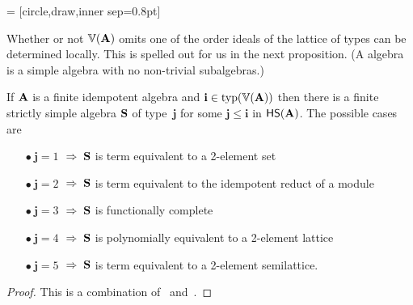 \newcommand{\dotsize}{0.8pt}
 = [circle,draw,inner sep=\dotsize]
\begin{center}
\newcommand{\figscale}{.7}
\end{center}
Whether or not $\operatorname{\mathbb{V}}(\mathbf{A})$ omits one of the order ideals of the lattice of types can be
determined locally.  This is spelled out for us in the next proposition.
(A  algebra is a simple
algebra with no non-trivial subalgebras.)


\begin{prop}
  \label{prop:2.1}
If $\mathbf{A}$ is a finite idempotent algebra and
$\mathbf{i} \in \operatorname{typ}(\operatorname{\mathbb{V}}(\mathbf{A}))$ then there
is a finite strictly simple algebra $\mathbf{S}$ of
type~$\mathbf{j}$ for
some $\mathbf{j} \leq \mathbf{i}$ in $\mathsf{H} \mathsf{S} (\mathbf{A})$.
The possible cases are
\begin{itemize}
\item[$\bullet\  \mathbf{j} = 1$] $\;\Rightarrow \;\mathbf{S}$ is term equivalent to a 2-element set
\item[$\bullet\   \mathbf{j} = 2$] $\;\Rightarrow \;\mathbf{S}$ is term equivalent to the idempotent reduct of a module
\item[$\bullet\   \mathbf{j} = 3$] $\;\Rightarrow \;\mathbf{S}$ is functionally complete
\item[$\bullet\   \mathbf{j} = 4$] $\;\Rightarrow \;\mathbf{S}$ is polynomially equivalent to a 2-element lattice
\item[$\bullet\   \mathbf{j} = 5$] $\;\Rightarrow \;\mathbf{S}$ is term equivalent to a 2-element semilattice.
\end{itemize} %
\end{prop}
\begin{proof}
  This is a combination of~\cite[Proposition~3.1]{MR2504025} and~\cite[Theorem~6.1]{MR1191235}.
\end{proof}

